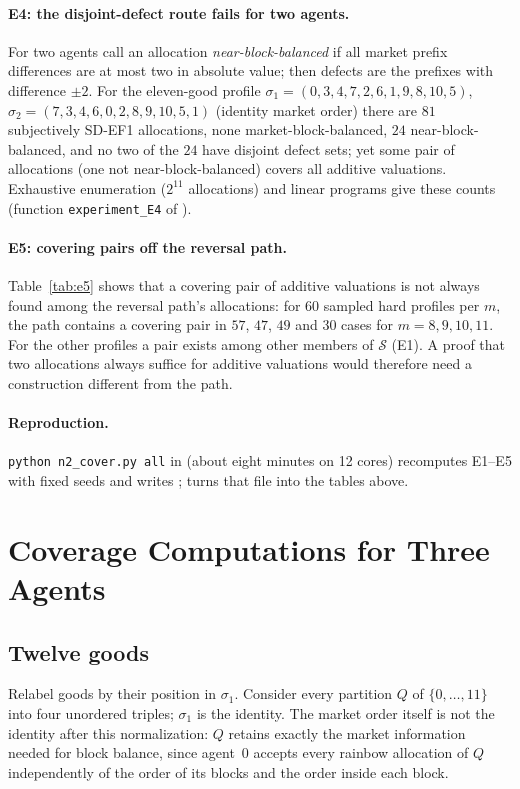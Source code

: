 \documentclass[11pt]{article}
\theoremstyle{definition}
\begin{document}
\paragraph{E4: the disjoint-defect route fails for two agents.}
For two agents call an allocation \emph{near-block-balanced} if all market prefix differences are at most two in absolute value; then defects are the prefixes with difference $\pm2$. For the eleven-good profile $\sigma_1=(0,3,4,7,2,6,1,9,8,10,5)$, $\sigma_2=(7,3,4,6,0,2,8,9,10,5,1)$ (identity market order) there are $81$ subjectively SD-EF1 allocations, none market-block-balanced, $24$ near-block-balanced, and no two of the $24$ have disjoint defect sets; yet some pair of allocations (one not near-block-balanced) covers all additive valuations. Exhaustive enumeration ($2^{11}$ allocations) and linear programs give these counts (function \texttt{experiment\_E4} of ).

\paragraph{E5: covering pairs off the reversal path.}
Table~\ref{tab:e5} shows that a covering pair of additive valuations is not always found among the reversal path's allocations: for $60$ sampled hard profiles per $m$, the path contains a covering pair in $57$, $47$, $49$ and $30$ cases for $m=8,9,10,11$. For the other profiles a pair exists among other members of $\mathcal S$ (E1). A proof that two allocations always suffice for additive valuations would therefore need a construction different from the path.


\paragraph{Reproduction.}
\texttt{python n2\_cover.py all} in  (about eight minutes on 12 cores) recomputes E1--E5 with fixed seeds and writes ;  turns that file into the tables above.

\section{Coverage Computations for Three Agents}\label{app:coverage}
\subsection{Twelve goods}
Relabel goods by their position in $\sigma_1$. Consider every partition $Q$ of $\{0,\dots,11\}$ into four unordered triples; $\sigma_1$ is the identity. The market order itself is not the identity after this normalization: $Q$ retains exactly the market information needed for block balance, since agent~0 accepts every rainbow allocation of $Q$ independently of the order of its blocks and the order inside each block.
\end{document}
